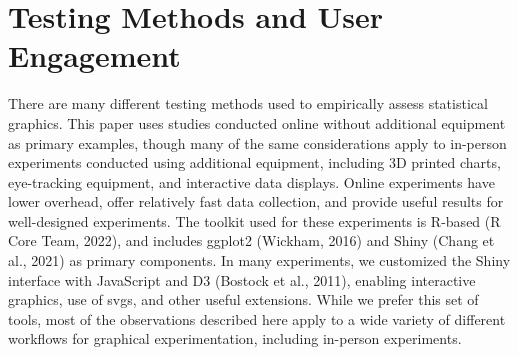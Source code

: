 \documentclass[
  10pt,
]{article}
\begin{document}
\section{Testing Methods and User Engagement}\label{sec-testing-methods}

There are many different testing methods used to empirically assess
statistical graphics. This paper uses studies conducted online without
additional equipment as primary examples, though many of the same
considerations apply to in-person experiments conducted using additional
equipment, including 3D printed charts, eye-tracking equipment, and
interactive data displays. Online experiments have lower overhead, offer
relatively fast data collection, and provide useful results for
well-designed experiments. The toolkit used for these experiments is
R-based (R Core Team, 2022), and includes ggplot2 (Wickham, 2016) and
Shiny (Chang et al., 2021) as primary components. In many experiments,
we customized the Shiny interface with JavaScript and D3 (Bostock et
al., 2011), enabling interactive graphics, use of svgs, and other useful
extensions. While we prefer this set of tools, most of the observations
described here apply to a wide variety of different workflows for
graphical experimentation, including in-person experiments.
\end{document}
